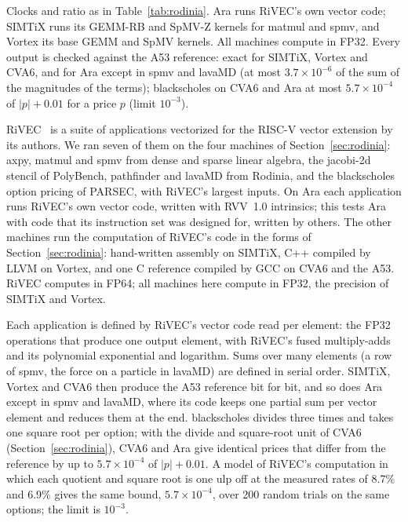 \documentclass[journal]{IEEEtran}
\begin{document}
\begin{table}[t]
\vspace{2pt}
\begin{minipage}{\textwidth}\footnotesize
Clocks and ratio as in Table~\ref{tab:rodinia}. Ara runs RiVEC's own vector code; SIMTiX
runs its GEMM-RB and SpMV-Z kernels for matmul and spmv, and Vortex its base GEMM and
SpMV kernels. All machines compute in FP32. Every output is checked against the A53
reference: exact for SIMTiX, Vortex and CVA6, and for Ara except in spmv and lavaMD
(at most $3.7\times10^{-6}$ of the sum of the magnitudes of the terms); blackscholes on
CVA6 and Ara at most $5.7\times10^{-4}$ of $|p|+0.01$ for a price $p$ (limit
$10^{-3}$).
\end{minipage}
\end{table}

RiVEC~\cite{rivec} is a suite of applications vectorized for the RISC-V vector
extension by its authors. We ran seven of them on the four machines of
Section~\ref{sec:rodinia}: axpy, matmul and spmv from dense and sparse linear algebra,
the jacobi-2d stencil of PolyBench, pathfinder and lavaMD from Rodinia, and the
blackscholes option pricing of PARSEC, with RiVEC's largest inputs. On Ara each
application runs RiVEC's own vector code, written with RVV~1.0 intrinsics; this tests
Ara with code that its instruction set was designed for, written by others. The other
machines run the computation of RiVEC's code in the forms of
Section~\ref{sec:rodinia}: hand-written assembly on SIMTiX, C++ compiled by LLVM on
Vortex, and one C reference compiled by GCC on CVA6 and the A53. RiVEC computes in
FP64; all machines here compute in FP32, the precision of SIMTiX and Vortex.

Each application is defined by RiVEC's vector code read per element: the FP32
operations that produce one output element, with RiVEC's fused multiply-adds and its
polynomial exponential and logarithm. Sums over many elements (a row of spmv, the
force on a particle in lavaMD) are defined in serial order. SIMTiX, Vortex and CVA6
then produce the A53 reference bit for bit, and so does Ara except in spmv and lavaMD,
where its code keeps one partial sum per vector element and reduces them at the end.
blackscholes divides three times and takes one square root per option; with the divide
and square-root unit of CVA6 (Section~\ref{sec:rodinia}), CVA6 and Ara give identical
prices that differ from the reference by up to $5.7\times10^{-4}$ of $|p|+0.01$. A
model of RiVEC's computation in which each quotient and square root is one ulp off at
the measured rates of 8.7\% and 6.9\% gives the same bound,
$5.7\times10^{-4}$, over 200 random trials on the same options; the limit is
$10^{-3}$.
\end{document}
